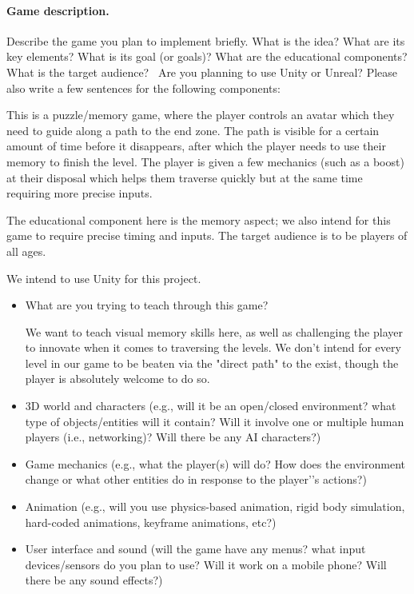 \documentclass[11pt]{article}
\begin{document}
\maketitle

\paragraph*{Game description.}
Describe the game you plan to implement briefly. What is the idea? What are its key elements? What is its goal (or goals)? What are the educational components? What is the target audience?  \ Are you planning to use Unity or Unreal? Please also write a few sentences  for the following components:

This is a puzzle/memory game, where the player controls an avatar which they need to guide along a path to the end zone. The path is visible for a certain amount of time before it disappears, after which the player needs to use their memory to finish the level. The player is given a few mechanics (such as a boost) at their disposal which helps them traverse quickly but at the same time requiring more precise inputs.

The educational component here is the memory aspect; we also intend for this game to require precise timing and inputs. The target audience is to be players of all ages.

We intend to use Unity for this project.

\begin{itemize}
\item What are you trying to teach through this game?

We want to teach visual memory skills here, as well as challenging the player to innovate when it comes to traversing the levels. We don't intend for every level in our game to be beaten via the "direct path" to the exist, though the player is absolutely welcome to do so.

\item 3D world and characters (e.g., will it be an open/closed environment? what type of objects/entities will it contain? Will it involve one or multiple human players (i.e., networking)? Will there be any AI characters?)

\item Game mechanics (e.g., what the player(s) will do? How does the environment change or what other entities do in response to the player’'s actions?)

\item Animation (e.g., will you use physics-based animation, rigid body simulation, hard-coded animations, keyframe animations, etc?)
\item User interface and sound (will the game have any menus? what input devices/sensors do you plan to use? Will it work on a mobile phone? Will there be any sound effects?)
\end{itemize}
\end{document}

